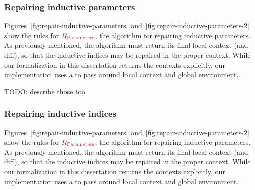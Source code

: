 \subsubsection{Repairing inductive parameters}

Figures~\ref{fig:repair-inductive-parameters}
and~\ref{fig:repair-inductive-parameters-2} show the rules for
$\textcolor{purple}{R_{\text{Parameters}}}{}$, the algorithm for repairing inductive parameters.  As
previously mentioned, the algorithm must return its final local context (and
diff), so that the inductive indices may be repaired in the proper context.
While our formalization in this dissertation returns the contexts explicitly,
our implementation uses a  to pass around local context and
global environment.





TODO: describe those too

\subsubsection{Repairing inductive indices}

Figures~\ref{fig:repair-inductive-parameters}
and~\ref{fig:repair-inductive-parameters-2} show the rules for
$\textcolor{purple}{R_{\text{Parameters}}}{}$, the algorithm for repairing inductive parameters.  As
previously mentioned, the algorithm must return its final local context (and
diff), so that the inductive indices may be repaired in the proper context.
While our formalization in this dissertation returns the contexts explicitly,
our implementation uses a  to pass around local context and
global environment.




